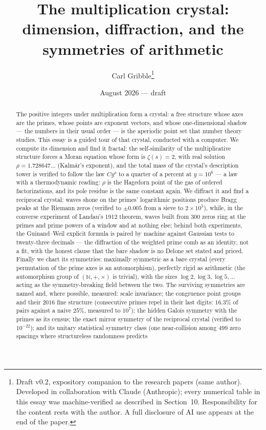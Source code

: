 \documentclass[11pt]{article}
\title{The multiplication crystal:\\ dimension, diffraction, and the symmetries of arithmetic}
\author{Carl Gribble\thanks{Draft v0.2, expository companion to the research papers
\cite{CompanionI,CompanionII,CompanionIII} (same author). Developed in collaboration with Claude
(Anthropic); every numerical table in this essay was machine-verified as described in Section~10.
Responsibility for the content rests with the author. A full disclosure of AI use appears at the end
of the paper.}}
\date{August 2026 --- draft}
\theoremstyle{remark}
\begin{document}
\maketitle

\begin{abstract}
The positive integers under multiplication form a crystal: a free structure whose axes are the
primes, whose points are exponent vectors, and whose one-dimensional shadow --- the numbers in their
usual order --- is the aperiodic point set that number theory studies. This essay is a guided tour of
that crystal, conducted with a computer. We compute its dimension and find it fractal: the
self-similarity of the multiplicative structure forces a Moran equation whose form is $\zeta(s) = 2$,
with real solution $\rho = 1.728647\ldots$ (Kalm\'ar's exponent), and the total mass of the crystal's
description tower is verified to follow the law $C y^{\rho}$ to a quarter of a percent at $y = 10^6$
--- a law with a thermodynamic reading: $\rho$ is the Hagedorn point of the gas of ordered
factorizations, and its pole residue is the same constant again.
We diffract it and find a reciprocal crystal: waves shone on the primes' logarithmic positions
produce Bragg peaks at the Riemann zeros (verified to $\pm 0.005$ from a sieve to $2\times 10^5$),
while, in the converse experiment of Landau's 1912 theorem, waves built from $300$ zeros ring at the
primes and prime powers of a window and at nothing else; behind both experiments, the Guinand--Weil
explicit formula is paired by machine against Gaussian tests to twenty-three decimals --- the
diffraction of the weighted prime comb as an identity, not a fit, with the honest clause that the
bare shadow is no Delone set stated and priced. Finally we chart its symmetries: maximally
symmetric as a bare crystal (every permutation of the prime axes is an automorphism), perfectly rigid
as arithmetic (the automorphism group of $(\mathbb{N}, +, \times)$ is trivial), with the sizes
$\log 2, \log 3, \log 5, \ldots$ acting as the symmetry-breaking field between the two. The surviving
symmetries are named and, where possible, measured: scale invariance; the congruence point groups and
their $2016$ fine structure (consecutive primes repel in their last digits: $16.3\%$ of pairs against
a naive $25\%$, measured to $10^7$); the hidden Galois symmetry with the primes as its census; the
exact mirror symmetry of the reciprocal crystal (verified to $10^{-22}$); and its unitary statistical
symmetry class (one near-collision among $499$ zero spacings where structureless randomness predicts

\end{abstract}
\end{document}
